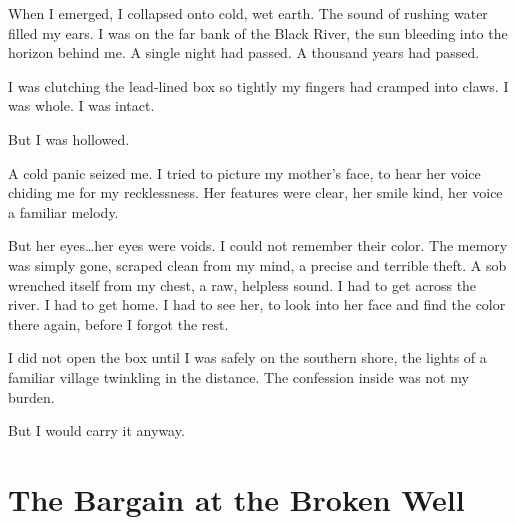 \documentclass[11pt]{article}
\begin{document}
When I emerged, I collapsed onto cold, wet earth. The sound of rushing water filled my ears. I was on the far bank of the Black River, the sun bleeding into the horizon behind me. A single night had passed. A thousand years had passed.

I was clutching the lead-lined box so tightly my fingers had cramped into claws. I was whole. I was intact.

But I was hollowed.

A cold panic seized me. I tried to picture my mother's face, to hear her voice chiding me for my recklessness. Her features were clear, her smile kind, her voice a familiar melody.

But her eyes\dots her eyes were voids. I could not remember their color. The memory was simply gone, scraped clean from my mind, a precise and terrible theft. A sob wrenched itself from my chest, a raw, helpless sound. I had to get across the river. I had to get home. I had to see her, to look into her face and find the color there again, before I forgot the rest.

I did not open the box until I was safely on the southern shore, the lights of a familiar village twinkling in the distance. The confession inside was not my burden.

But I would carry it anyway.

\newpage

\section*{The Bargain at the Broken Well}
\end{document}
